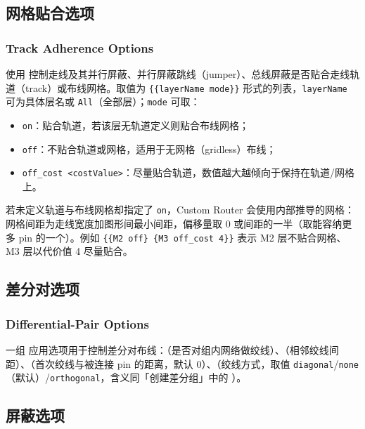 \subsection{网格贴合选项}
\subsubsection*{Track Adherence Options}

使用  控制走线及其并行屏蔽、并行屏蔽跳线（jumper）、总线屏蔽是否贴合走线轨道（track）或布线网格。取值为 \texttt{\{\{layerName mode\}\}} 形式的列表，\texttt{layerName} 可为具体层名或 \texttt{All}（全部层）；\texttt{mode} 可取：
\begin{itemize}
  \item \texttt{on}：贴合轨道，若该层无轨道定义则贴合布线网格；
  \item \texttt{off}：不贴合轨道或网格，适用于无网格（gridless）布线；
  \item \texttt{off\_cost~<costValue>}：尽量贴合轨道，数值越大越倾向于保持在轨道/网格上。
\end{itemize}

若未定义轨道与布线网格却指定了 \texttt{on}，Custom Router 会使用内部推导的网格：网格间距为走线宽度加图形间最小间距，偏移量取 0 或间距的一半（取能容纳更多 pin 的一个）。例如 \texttt{\{\{M2 off\} \{M3 off\_cost 4\}\}} 表示 M2 层不贴合网格、M3 层以代价值 4 尽量贴合。

\subsection{差分对选项}
\subsubsection*{Differential-Pair Options}

一组  应用选项用于控制差分对布线：（是否对组内网络做绞线）、（相邻绞线间距）、（首次绞线与被连接 pin 的距离，默认 0）、（绞线方式，取值 \texttt{diagonal}/\texttt{none}（默认）/\texttt{orthogonal}，含义同「创建差分组」中的 ）。

\subsection{屏蔽选项}
